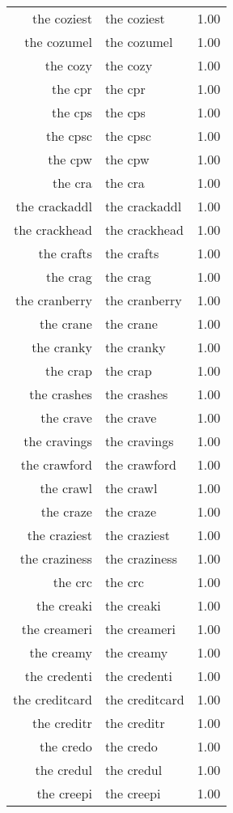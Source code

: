 \begin{table}[ht]
\begin{tabular}{rlr}
  the coziest & the coziest & 1.00 \\ 
  the cozumel & the cozumel & 1.00 \\ 
  the cozy & the cozy & 1.00 \\ 
  the cpr & the cpr & 1.00 \\ 
  the cps & the cps & 1.00 \\ 
  the cpsc & the cpsc & 1.00 \\ 
  the cpw & the cpw & 1.00 \\ 
  the cra & the cra & 1.00 \\ 
  the crackaddl & the crackaddl & 1.00 \\ 
  the crackhead & the crackhead & 1.00 \\ 
  the crafts & the crafts & 1.00 \\ 
  the crag & the crag & 1.00 \\ 
  the cranberry & the cranberry & 1.00 \\ 
  the crane & the crane & 1.00 \\ 
  the cranky & the cranky & 1.00 \\ 
  the crap & the crap & 1.00 \\ 
  the crashes & the crashes & 1.00 \\ 
  the crave & the crave & 1.00 \\ 
  the cravings & the cravings & 1.00 \\ 
  the crawford & the crawford & 1.00 \\ 
  the crawl & the crawl & 1.00 \\ 
  the craze & the craze & 1.00 \\ 
  the craziest & the craziest & 1.00 \\ 
  the craziness & the craziness & 1.00 \\ 
  the crc & the crc & 1.00 \\ 
  the creaki & the creaki & 1.00 \\ 
  the creameri & the creameri & 1.00 \\ 
  the creamy & the creamy & 1.00 \\ 
  the credenti & the credenti & 1.00 \\ 
  the creditcard & the creditcard & 1.00 \\ 
  the creditr & the creditr & 1.00 \\ 
  the credo & the credo & 1.00 \\ 
  the credul & the credul & 1.00 \\ 
  the creepi & the creepi & 1.00 \\ 

\end{tabular}
\end{table}
